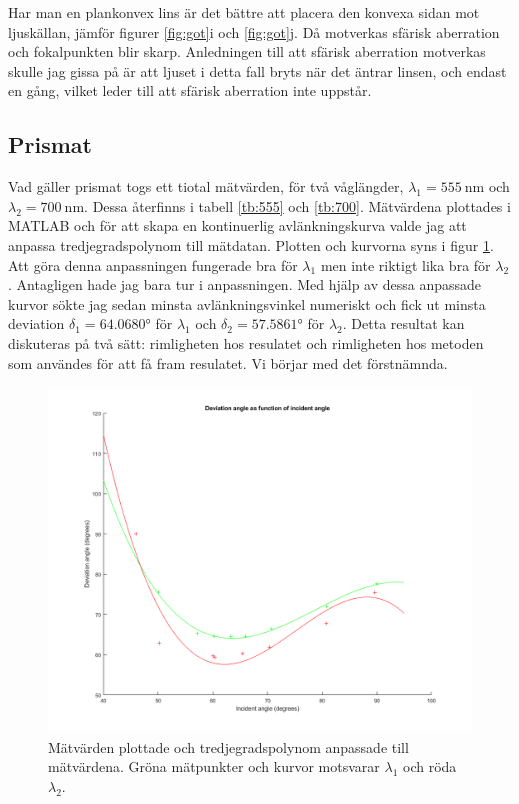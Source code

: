 \documentclass[a4paper]{article}
\begin{document}
Har man en plankonvex lins är det bättre att placera den konvexa sidan mot ljuskällan, jämför figurer \ref{fig:got}i och \ref{fig:got}j. Då motverkas
sfärisk aberration och fokalpunkten blir skarp. Anledningen till att sfärisk aberration motverkas skulle jag gissa på är att ljuset i detta fall bryts 
när det äntrar linsen, och endast en gång, vilket leder till att sfärisk aberration inte uppstår.

\subsection{Prismat}
Vad gäller prismat togs ett tiotal mätvärden, för två våglängder, $\lambda_1=\SI{555}{\nano\meter}$ och $\lambda_2=\SI{700}{\nano\meter}$.
Dessa återfinns i tabell \ref{tb:555} och \ref{tb:700}. Mätvärdena plottades i MATLAB och för att skapa en kontinuerlig avlänkningskurva
valde jag att anpassa tredjegradspolynom till mätdatan. Plotten och kurvorna syns i figur \ref{fig: plot}. Att göra denna anpassningen
fungerade bra för $\lambda_1$ men inte riktigt lika bra för $\lambda_2$. Antagligen hade jag bara tur i anpassningen. Med hjälp av dessa
anpassade kurvor sökte jag sedan minsta avlänkningsvinkel numeriskt och fick ut minsta deviation $\delta_1 = \ang{64.0680}$
för $\lambda_1$ och $\delta_2 = \ang{57.5861}$ för $\lambda_2$. Detta resultat kan diskuteras på två sätt: rimligheten hos resulatet och
rimligheten hos metoden som användes för att få fram resulatet. Vi börjar med det förstnämnda.

\begin{figure}[h]
    \centering
    \includegraphics[width=\textwidth]{graph}
    \caption{Mätvärden plottade och tredjegradspolynom anpassade till mätvärdena. Gröna mätpunkter och kurvor motsvarar $\lambda_1$ och röda $\lambda_2$.}
    \label{fig: plot}
\end{figure}
\end{document}
